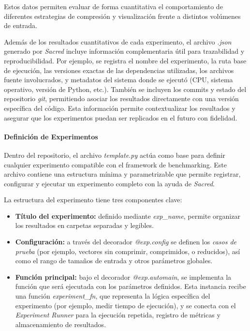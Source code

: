 Estos datos permiten evaluar de forma cuantitativa el comportamiento de diferentes estrategias de compresión y visualización frente a distintos volúmenes de entrada.

Además de los resultados cuantitativos de cada experimento, el archivo \textit{.json} generado por \textit{Sacred} incluye información complementaria útil para trazabilidad y reproducibilidad. Por ejemplo, se registra el nombre del experimento, la ruta base de ejecución, las versiones exactas de las dependencias utilizadas, los archivos fuente involucrados, y metadatos del sistema donde se ejecutó (CPU, sistema operativo, versión de Python, etc.). También se incluyen los commits y estado del repositorio \textit{git}, permitiendo asociar los resultados directamente con una versión específica del código. Esta información permite contextualizar los resultados y asegurar que los experimentos puedan ser replicados en el futuro con fidelidad.

\paragraph{Definición de Experimentos}
\vspace{0.5em}

Dentro del repositorio, el archivo \textit{template.py} actúa como base para definir cualquier experimento compatible con el framework de benchmarking. Este archivo contiene una estructura mínima y parametrizable que permite registrar, configurar y ejecutar un experimento completo con la ayuda de \textit{Sacred}.

La estructura del experimento tiene tres componentes clave:

\begin{itemize}
    \item \textbf{Título del experimento:} definido mediante \textit{exp\_name}, permite organizar los resultados en carpetas separadas y legibles.
    \item \textbf{Configuración:} a través del decorador \textit{@exp.config} se definen los \textit{casos de prueba} (por ejemplo, vectores sin comprimir, comprimidos, o reducidos), así como el rango de tamaños de entrada y otros parámetros globales.
    \item \textbf{Función principal:} bajo el decorador \textit{@exp.automain}, se implementa la función que será ejecutada con los parámetros definidos. Esta instancia recibe una función \textit{experiment\_fn}, que representa la lógica específica del experimento (por ejemplo, medir tiempo de ejecución), y se conecta con el \textit{Experiment Runner} para la ejecución repetida, registro de métricas y almacenamiento de resultados.
\end{itemize}

